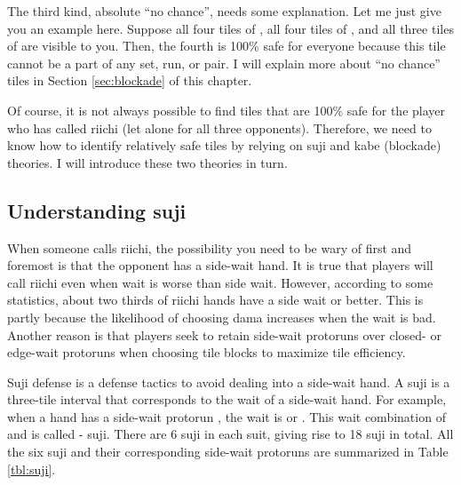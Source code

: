 \bigskip
The third kind, absolute ``no chance'', needs some explanation. Let me just give you an example here. Suppose all four tiles of {\large {}}, all four tiles of {\large {}}, and all three tiles of {\large {}} are visible to you. Then, the fourth {\large {}} is 100\% safe for everyone because this tile cannot be a part of any set, run, or pair. I will explain more about ``no chance'' tiles in Section \ref{sec:blockade} of this chapter.

\bigskip
Of course, it is not always possible to find tiles that are 100\% safe for the player who has called {\jap riichi} (let alone for all three opponents). Therefore, we need to know how to identify relatively safe tiles by relying on {\jap suji} and {\jap kabe} (blockade) theories. I will introduce these two theories in turn.

\subsection{Understanding {\jap suji}}  \label{sec:suji}

When someone calls {\jap riichi}, the possibility you need to be wary of first and foremost is that the opponent has a side-wait hand. It is true that players will call {\jap riichi} even when wait is worse than side wait. However, according to some statistics, about two thirds of {\jap riichi} hands have a side wait or better. This is partly because the likelihood of choosing {\jap dama} increases when the wait is bad. Another reason is that players seek to retain side-wait protoruns over closed- or edge-wait protoruns when choosing tile blocks to maximize tile efficiency.

\bigskip
{\jap Suji} defense is a defense tactics to avoid dealing into a side-wait hand. A {\jap suji} is a three-tile interval that corresponds to the wait of a side-wait hand. For example, when a hand has a side-wait protorun {\large {}}, the wait is {\large {}} or {\large {}}. This wait combination of {\large{}} and {\large{}} is called {\large{}-} {\jap suji}. There are 6 {\jap suji} in each suit, giving rise to 18 {\jap suji} in total. All the six {\jap suji} and their corresponding side-wait protoruns are summarized in Table \ref{tbl:suji}. 

